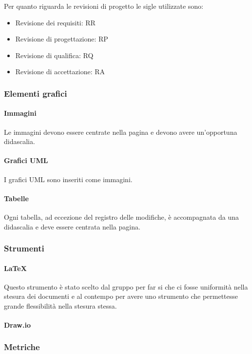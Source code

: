 \documentclass[../norme_di_progetto.tex]{subfiles}
\begin{document}
Per quanto riguarda le revisioni di progetto le sigle utilizzate sono:
\begin{itemize}
    \item Revisione dei requisiti: RR
    \item Revisione di progettazione: RP
    \item Revisione di qualifica: RQ
    \item Revisione di accettazione: RA
\end{itemize}

\subsubsection{Elementi grafici}

\paragraph{Immagini}
Le immagini devono essere centrate nella pagina e devono avere un'opportuna didascalia.

\paragraph{Grafici UML}
I grafici UML sono inseriti come immagini.

\paragraph{Tabelle}
Ogni tabella, ad eccezione del registro delle modifiche, è accompagnata da una didascalia e deve essere centrata nella pagina.

\subsubsection{Strumenti}

\paragraph{\LaTeX}
Questo strumento è stato scelto dal gruppo per far si che ci fosse uniformità nella stesura dei documenti e al contempo per avere uno strumento che permettesse grande flessibilità nella stesura stessa.

\paragraph{Draw.io}


\subsubsection{Metriche}
\end{document}
